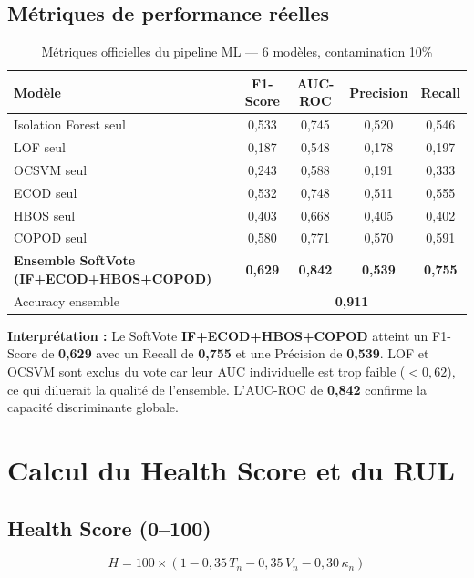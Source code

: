 \documentclass[12pt,a4paper]{report}
\begin{document}
\subsection{Métriques de performance réelles}

\begin{table}[h]
\centering
\caption{Métriques officielles du pipeline ML — 6 modèles, contamination 10\%}
\label{tab:metriques_ml}
\begin{tabular}{lcccc}
\toprule
\textbf{Modèle} & \textbf{F1-Score} & \textbf{AUC-ROC} & \textbf{Precision} & \textbf{Recall} \\
\midrule
Isolation Forest seul & 0,533 & 0,745 & 0,520 & 0,546 \\
LOF seul              & 0,187 & 0,548 & 0,178 & 0,197 \\
OCSVM seul            & 0,243 & 0,588 & 0,191 & 0,333 \\
ECOD seul             & 0,532 & 0,748 & 0,511 & 0,555 \\
HBOS seul             & 0,403 & 0,668 & 0,405 & 0,402 \\
COPOD seul            & 0,580 & 0,771 & 0,570 & 0,591 \\
\textbf{Ensemble SoftVote (IF+ECOD+HBOS+COPOD)} & \textbf{0,629} & \textbf{0,842} & \textbf{0,539} & \textbf{0,755} \\
Accuracy ensemble     & \multicolumn{4}{c}{\textbf{0,911}} \\
\bottomrule
\end{tabular}
\end{table}

\noindent\textbf{Interprétation :} Le SoftVote \textbf{IF+ECOD+HBOS+COPOD} atteint
un F1-Score de \textbf{0,629} avec un Recall de \textbf{0,755} et une Précision de
\textbf{0,539}. LOF et OCSVM sont exclus du vote car leur AUC individuelle est trop
faible ($< 0{,}62$), ce qui diluerait la qualité de l'ensemble. L'AUC-ROC de
\textbf{0,842} confirme la capacité discriminante globale.

\section{Calcul du Health Score et du RUL}

\subsection{Health Score (0--100)}

\begin{equation}
  H = 100 \times (1 - 0{,}35\,T_n - 0{,}35\,V_n - 0{,}30\,\kappa_n)
\end{equation}
\end{document}
